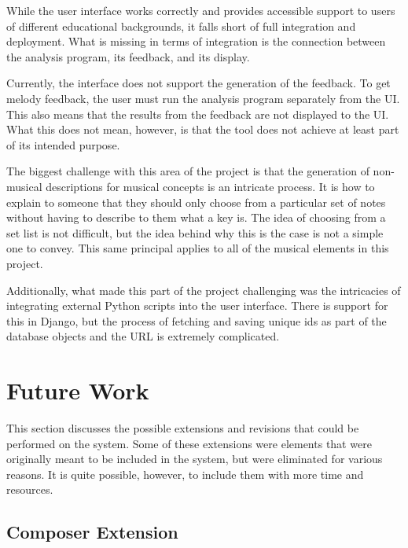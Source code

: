 While the user interface works correctly and provides accessible support to users of different educational backgrounds, it falls short of full integration and deployment.  What is missing in terms of integration is the connection between the analysis program, its feedback, and its display.

\vspace{\baselineskip}

Currently, the interface does not support the generation of the feedback.  To get melody feedback, the user must run the analysis program separately from the UI.  This also means that the results from the feedback are not displayed to the UI.  What this does not mean, however, is that the tool does not achieve at least part of its intended purpose.

\vspace{\baselineskip}

The biggest challenge with this area of the project is that the generation of non-musical descriptions for musical concepts is an intricate process.  It is how to explain to someone that they should only choose from a particular set of notes without having to describe to them what a key is.  The idea of choosing from a set list is not difficult, but the idea behind why this is the case is not a simple one to convey.  This same principal applies to all of the musical elements in this project.

\vspace{\baselineskip}

Additionally, what made this part of the project challenging was the intricacies of integrating external Python scripts into the user interface.  There is support for this in Django, but the process of fetching and saving unique ids as part of the database objects and the URL is extremely complicated.

\section{Future Work}
\label{sec:futurework}

This section discusses the possible extensions and revisions that could be performed on the system.  Some of these extensions were elements that were originally meant to be included in the system, but were eliminated for various reasons.  It is quite possible, however, to include them with more time and resources.

\subsection{Composer Extension}
\label{subsec:composerextension}

